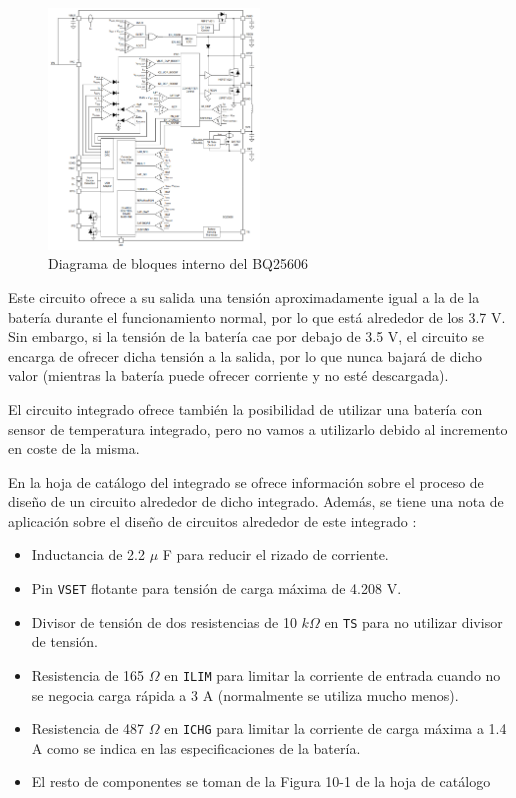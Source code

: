 \begin{figure}[h]
    \centering
    \includegraphics[width=0.5\textwidth]{images/2/2-1/BQ25606Bloques.png}
    \caption{Diagrama de bloques interno del BQ25606}
    \label{fig:2-1-bloquesInternosBQ25606}
\end{figure}

Este circuito ofrece a su salida una tensión aproximadamente igual a la de la batería durante el funcionamiento normal, por lo que está alrededor de los 3.7 V. Sin embargo, si la tensión de la batería cae por debajo de 3.5 V, el circuito se encarga de ofrecer dicha tensión a la salida, por lo que nunca bajará de dicho valor (mientras la batería puede ofrecer corriente y no esté descargada).

El circuito integrado ofrece también la posibilidad de utilizar una batería con sensor de temperatura integrado, pero no vamos a utilizarlo debido al incremento en coste de la misma.

En la hoja de catálogo del integrado se ofrece información sobre el proceso de diseño de un circuito alrededor de dicho integrado. Además, se tiene una nota de aplicación sobre el diseño de circuitos alrededor de este integrado \cite{texasinstrumentsDesigningStandaloneSingle}:

\begin{itemize}
    \item Inductancia de 2.2 $\mu$ F para reducir el rizado de corriente.
    \item Pin \texttt{VSET} flotante para tensión de carga máxima de 4.208 V.
    \item Divisor de tensión de dos resistencias de 10 $k\Omega$ en \texttt{TS} para no utilizar divisor de tensión.
    \item Resistencia de 165 $\Omega$ en \texttt{ILIM} para limitar la corriente de entrada cuando no se negocia carga rápida a 3 A (normalmente se utiliza mucho menos).
    \item Resistencia de 487 $\Omega$ en \texttt{ICHG} para limitar la corriente de carga máxima a 1.4 A como se indica en las especificaciones de la batería.
    \item El resto de componentes se toman de la Figura 10-1 de la hoja de catálogo
\end{itemize}

